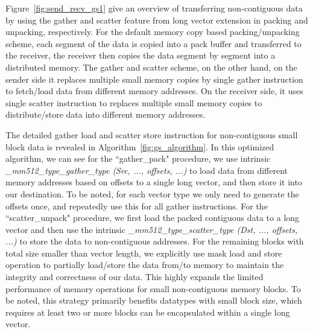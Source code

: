 \documentclass[conference]{IEEEtran}
\begin{document}
Figure~\ref{fig:send_recv_gs1} give an overview of \ourwork transferring non-contiguous data
by using the gather and scatter feature from long vector extension in packing and unpacking, respectively.
For the default memory copy based packing/unpacking scheme, each segment of the data is copied into a pack
buffer and transferred to the receiver, the receiver then copies the data segment by segment into a distributed memory.
The gather and scatter scheme, on the other hand, on the sender side it replaces multiple small memory
copies by single gather instruction to fetch/load data from different memory addresses.
On the receiver side, it uses single scatter instruction to replaces multiple small memory
copies to distribute/store data into different memory addresses.

The detailed gather load and scatter store instruction for non-contiguous
small block data is revealed in Algorithm~\ref{fig:gs_algorithm}.
In this optimized algorithm, we can see for the ``gather\_pack" procedure, we use
intrinsic \emph{\textit{\_mm512\_type\_gather\_type (Src, ..., offsets, ...)}} to load data from
different memory addresses based on offsets to a single long vector, and then store it into our destination.
To be noted, for each vector type we only need to generate the offsets once, and repeatedly use this for all gather instructions.
For the ``scatter\_unpack" procedure, we first load the packed contiguous data to a long vector and then use the intrinsic
\emph{\textit{\_mm512\_type\_scatter\_type (Dst, ..., offsets, ...)}} to store the data to non-contiguous addresses.
For the remaining blocks with total size smaller than vector length, we explicitly use mask load and store operation to partially load/store the data from/to memory to maintain the integrity and correctness of our data.
This highly expands the limited performance of memory operations for small non-contiguous memory blocks. To be noted,
this strategy primarily benefits datatypes with small block size, which requires at least two or more blocks can be encapsulated
within a single long vector.

\end{document}
